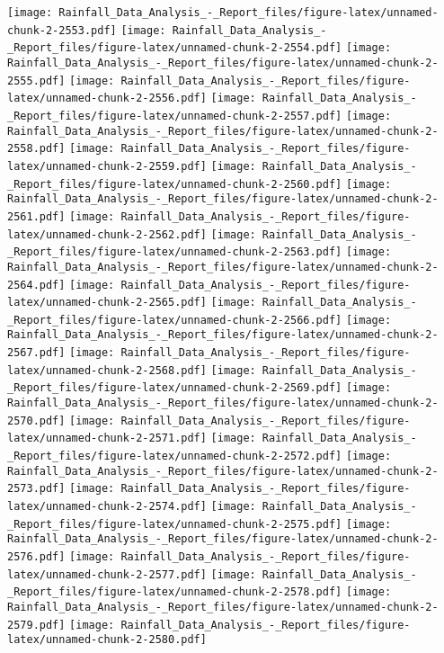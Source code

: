 \documentclass[
]{article}
\begin{document}
\texttt{[image: Rainfall\_Data\_Analysis\_-\_Report\_files/figure-latex/unnamed-chunk-2-2553.pdf]}
\texttt{[image: Rainfall\_Data\_Analysis\_-\_Report\_files/figure-latex/unnamed-chunk-2-2554.pdf]}
\texttt{[image: Rainfall\_Data\_Analysis\_-\_Report\_files/figure-latex/unnamed-chunk-2-2555.pdf]}
\texttt{[image: Rainfall\_Data\_Analysis\_-\_Report\_files/figure-latex/unnamed-chunk-2-2556.pdf]}
\texttt{[image: Rainfall\_Data\_Analysis\_-\_Report\_files/figure-latex/unnamed-chunk-2-2557.pdf]}
\texttt{[image: Rainfall\_Data\_Analysis\_-\_Report\_files/figure-latex/unnamed-chunk-2-2558.pdf]}
\texttt{[image: Rainfall\_Data\_Analysis\_-\_Report\_files/figure-latex/unnamed-chunk-2-2559.pdf]}
\texttt{[image: Rainfall\_Data\_Analysis\_-\_Report\_files/figure-latex/unnamed-chunk-2-2560.pdf]}
\texttt{[image: Rainfall\_Data\_Analysis\_-\_Report\_files/figure-latex/unnamed-chunk-2-2561.pdf]}
\texttt{[image: Rainfall\_Data\_Analysis\_-\_Report\_files/figure-latex/unnamed-chunk-2-2562.pdf]}
\texttt{[image: Rainfall\_Data\_Analysis\_-\_Report\_files/figure-latex/unnamed-chunk-2-2563.pdf]}
\texttt{[image: Rainfall\_Data\_Analysis\_-\_Report\_files/figure-latex/unnamed-chunk-2-2564.pdf]}
\texttt{[image: Rainfall\_Data\_Analysis\_-\_Report\_files/figure-latex/unnamed-chunk-2-2565.pdf]}
\texttt{[image: Rainfall\_Data\_Analysis\_-\_Report\_files/figure-latex/unnamed-chunk-2-2566.pdf]}
\texttt{[image: Rainfall\_Data\_Analysis\_-\_Report\_files/figure-latex/unnamed-chunk-2-2567.pdf]}
\texttt{[image: Rainfall\_Data\_Analysis\_-\_Report\_files/figure-latex/unnamed-chunk-2-2568.pdf]}
\texttt{[image: Rainfall\_Data\_Analysis\_-\_Report\_files/figure-latex/unnamed-chunk-2-2569.pdf]}
\texttt{[image: Rainfall\_Data\_Analysis\_-\_Report\_files/figure-latex/unnamed-chunk-2-2570.pdf]}
\texttt{[image: Rainfall\_Data\_Analysis\_-\_Report\_files/figure-latex/unnamed-chunk-2-2571.pdf]}
\texttt{[image: Rainfall\_Data\_Analysis\_-\_Report\_files/figure-latex/unnamed-chunk-2-2572.pdf]}
\texttt{[image: Rainfall\_Data\_Analysis\_-\_Report\_files/figure-latex/unnamed-chunk-2-2573.pdf]}
\texttt{[image: Rainfall\_Data\_Analysis\_-\_Report\_files/figure-latex/unnamed-chunk-2-2574.pdf]}
\texttt{[image: Rainfall\_Data\_Analysis\_-\_Report\_files/figure-latex/unnamed-chunk-2-2575.pdf]}
\texttt{[image: Rainfall\_Data\_Analysis\_-\_Report\_files/figure-latex/unnamed-chunk-2-2576.pdf]}
\texttt{[image: Rainfall\_Data\_Analysis\_-\_Report\_files/figure-latex/unnamed-chunk-2-2577.pdf]}
\texttt{[image: Rainfall\_Data\_Analysis\_-\_Report\_files/figure-latex/unnamed-chunk-2-2578.pdf]}
\texttt{[image: Rainfall\_Data\_Analysis\_-\_Report\_files/figure-latex/unnamed-chunk-2-2579.pdf]}
\texttt{[image: Rainfall\_Data\_Analysis\_-\_Report\_files/figure-latex/unnamed-chunk-2-2580.pdf]}
\end{document}
